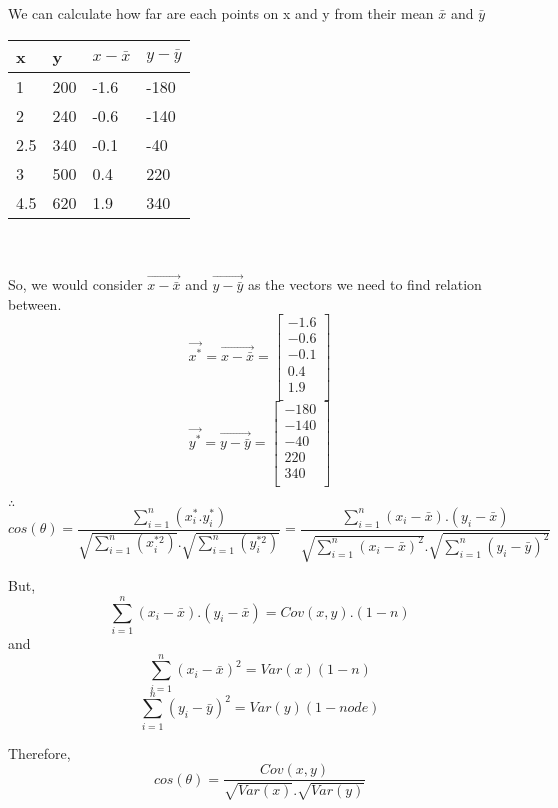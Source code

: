 \documentclass{article}
\begin{document}
We can calculate how far are each points on x and y from their mean $\bar{x}$ and $\bar{y}$\\
\begin{tabular}{|l|l|l|l|}
  \hline
  \textbf{x} & \textbf{y} & \textbf{$x-\bar{x}$} & \textbf{$y-\bar{y}$} \\
  \hline
  1          & 200        & -1.6                 & -180                 \\
  2          & 240        & -0.6                 & -140                 \\
  2.5        & 340        & -0.1                 & -40                  \\
  3          & 500        & 0.4                  & 220                  \\
  4.5        & 620        & 1.9                  & 340                  \\
  \hline
\end{tabular}
\\\\
So, we would consider $\vec{x-\bar{x}}$ and $\vec{y-\bar{y}}$ as the vectors we need to find relation between.
$$
  \vec{x^*}=\vec{x-\bar{x}}=\begin{bmatrix}
    -1.6 \\
    -0.6 \\
    -0.1 \\
    0.4  \\
    1.9  \\
  \end{bmatrix}
$$
$$
  \vec{y^*}=\vec{y-\bar{y}}=\begin{bmatrix}
    -180 \\
    -140 \\
    -40  \\
    220  \\
    340  \\
  \end{bmatrix}
$$

$\therefore$
$$
  cos(\theta)=\frac{\sum_{i=1}^{n}(x_i^*.y_i^*)}{\sqrt{\sum_{i=1}^{n}(x_i^{*2})}.\sqrt{\sum_{i=1}^{n}(y_i^{*2})}}=\frac{\sum_{i=1}^{n}(x_i-\bar{x}).(y_i-\bar{x})}{\sqrt{\sum_{i=1}^{n}(x_i-\bar{x})^2}.\sqrt{\sum_{i=1}^{n}(y_i-\bar{y})^2}}
$$

But,
$$
  \sum_{i=1}^{n}(x_i-\bar{x}).(y_i-\bar{x})=Cov(x,y).(1-n)
$$
and
$$
  \sum_{i=1}^{n}(x_i-\bar{x})^2=Var(x)(1-n)
$$
$$
  \sum_{i=1}^{n}(y_i-\bar{y})^2=Var(y)(1-node)
$$

Therefore,
$$
  cos(\theta)=\frac{Cov(x,y)}{\sqrt{Var(x)}.\sqrt{Var(y)}}
$$
\end{document}
